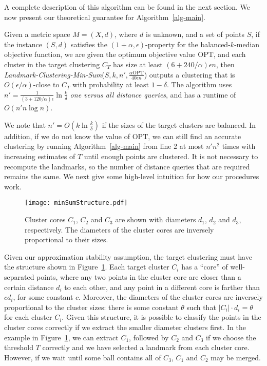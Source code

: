 \documentclass{llncs} \usepackage{algorithm}
\newcommand{\OPT}{\mathrm{OPT}}
\begin{document}
A complete description of this algorithm can be found in the next section.  We now present our theoretical guarantee for Algorithm~\ref{alg-main}.

\begin{theorem}\label{thm:Main}
Given a metric space $M = (X,d)$, where $d$ is unknown, and a set of points $S$,
if the instance $(S,d)$ satisfies the $(1+\alpha,\epsilon)$-property for the balanced-$k$-median objective function, we are given the optimum objective value $\OPT$, and each cluster in the target clustering $C_{T}$ has size at least
$(6+240/\alpha)\epsilon n$, then \emph{Landmark-Clustering-Min-Sum}($S,k,n',\frac{\alpha \OPT}{40 \epsilon n}$) outputs a clustering that is $O(\epsilon/\alpha)$-close to $C_{T}$ with probability at least $1-\delta$.   The algorithm uses $n' = \frac{1}{(3+120/\alpha)\epsilon} \ln \frac{k}{\delta}$ \emph{one versus all distance queries}, and has a runtime of $O(n' n \log n)$.
\end{theorem}

We note that $n' = O(k \ln \frac{k}{\delta})$ if the sizes of the target clusters are balanced.  In addition, if we do not know the value of $\OPT$, we can still find an accurate clustering by running Algorithm~\ref{alg-main} from line 2 at most $n' n^2$ times with increasing estimates of $T$ until enough points are clustered.  It is not necessary to recompute the landmarks, so the number of distance queries that are required remains the same.  We next give some high-level intuition for how our procedures work.

\begin{figure}
\begin{center}
\texttt{[image: minSumStructure.pdf]}
\caption{Cluster cores $C_{1}$, $C_{2}$ and $C_{3}$ are shown with diameters $d_{1}$, $d_{2}$ and $d_{3}$, respectively.  The diameters of the cluster cores are inversely proportional to their sizes.  \label{fig:minSumStructure}}
\end{center}
\end{figure}

Given our approximation stability assumption, the target clustering must have the structure shown in Figure~\ref{fig:minSumStructure}.  Each target cluster $C_{i}$ has a ``core'' of well-separated points, where any two points in the cluster core are closer than a certain distance $d_{i}$ to each other, and any point in a different core is farther than $c d_{i}$, for some constant $c$.  Moreover, the diameters of the cluster cores are inversely proportional to the cluster sizes: there is some constant $\theta$ such that $\vert C_{i} \vert \cdot d_{i} = \theta$ for each cluster $C_{i}$.  Given this structure, it is possible to classify the points in the cluster cores correctly if we extract the smaller diameter clusters first.  In the example in Figure~\ref{fig:minSumStructure}, we can extract $C_{1}$, followed by $C_{2}$ and $C_{3}$ if we choose the threshold $T$ correctly and we have selected a landmark from each cluster core.  However, if we wait until some ball contains all of $C_{3}$, $C_{1}$ and $C_{2}$ may be merged.
\end{document}
